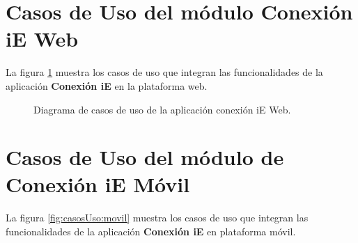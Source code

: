 \section{Casos de Uso del módulo Conexión iE Web }

    La figura \ref{fig:casosUso:web} muestra los casos de uso que integran las funcionalidades de la aplicación \textbf{Conexión iE} en la plataforma web.
    \begin{figure}[h!]
	\begin{center}
	\caption{Diagrama de casos de uso de la aplicación conexión iE Web. \label{fig:casosUso:web}}
	\end{center}
    \end{figure}

\section{Casos de Uso del módulo de Conexión iE Móvil}
La figura \ref{fig:casosUso:movil} muestra los casos de uso que integran las funcionalidades de la aplicación \textbf{Conexión iE} en plataforma móvil.

